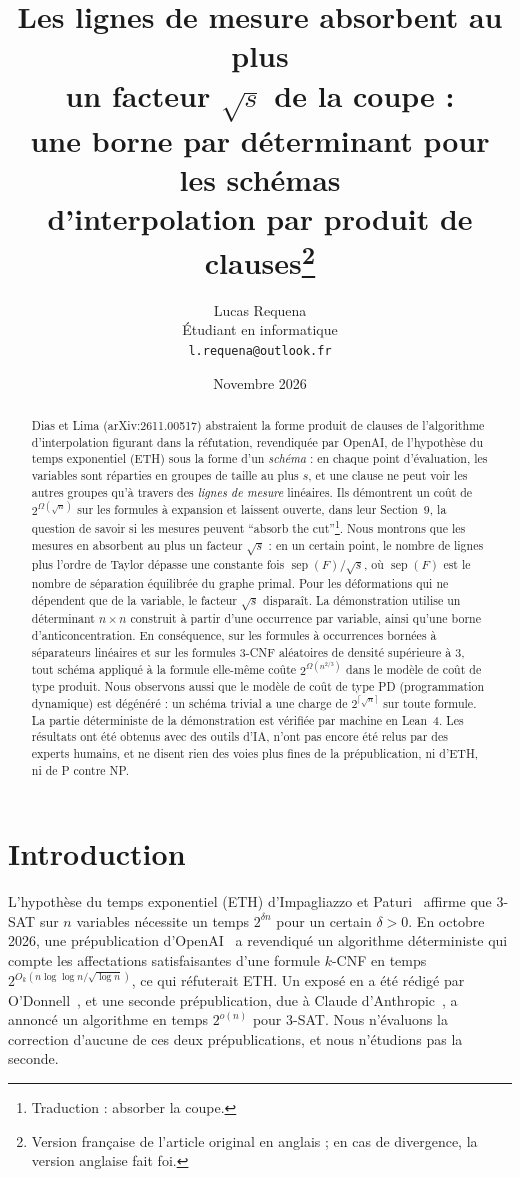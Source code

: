 \documentclass[11pt,a4paper]{article}
\title{Les lignes de mesure absorbent au plus\\ un facteur \texorpdfstring{$\sqrt{s}$}{sqrt(s)} de la coupe :\\
une borne par déterminant pour les schémas\\ d'interpolation par produit de
clauses\thanks{Version française de l'article original en anglais ; en cas de divergence, la
version anglaise fait foi.}}
\author{Lucas Requena\\[2pt]
{\small Étudiant en informatique}\\
{\small \texttt{l.requena@outlook.fr}}}
\date{Novembre 2026}
\makeatletter
\theoremstyle{definition}
\theoremstyle{remark}
\newcommand{\sep}{\operatorname{sep}}
\newcommand{\englishhyph}{\@ifundefined{l@english}{}{\language\l@english}}
\newcommand{\eng}[1]{{\englishhyph #1}}
\makeatother
\begin{document}
\maketitle

\begin{abstract}
Dias et Lima (arXiv:2611.00517) abstraient la forme produit de clauses de l'algorithme
d'interpolation figurant dans la réfutation, revendiquée par OpenAI, de l'hypothèse du temps
exponentiel (ETH) sous la forme d'un \emph{schéma} : en chaque point d'évaluation, les
variables sont réparties en groupes de taille au plus $s$, et une clause ne peut voir les
autres groupes qu'à travers des \emph{lignes de mesure} linéaires. Ils démontrent un coût de
$2^{\Omega(\sqrt n)}$ sur les formules à expansion et laissent ouverte, dans leur
Section~9, la question de savoir si les mesures peuvent \eng{``absorb the
cut''}\footnote{Traduction : \og absorber la coupe\fg{}.}. Nous montrons que les mesures en
absorbent au plus un facteur $\sqrt{s}$ : en un certain point, le nombre de lignes plus
l'ordre de Taylor dépasse une constante fois $\sep(F)/\sqrt{s}$, où $\sep(F)$ est le nombre
de séparation équilibrée du graphe primal. Pour les déformations qui ne dépendent que de la
variable, le facteur $\sqrt s$ disparaît. La démonstration utilise un déterminant
$n\times n$ construit à partir d'une occurrence par variable, ainsi qu'une borne
d'anticoncentration. En conséquence, sur les formules à occurrences bornées à séparateurs
linéaires et sur les formules 3-CNF aléatoires de densité supérieure à $3$, tout schéma
appliqué à la formule elle-même coûte $2^{\Omega(n^{2/3})}$ dans le modèle de coût de type
produit. Nous observons aussi que le modèle de coût de type PD (programmation dynamique) est
dégénéré : un schéma trivial a une charge de $2^{\lceil\sqrt n\rceil}$ sur toute formule. La
partie déterministe de la démonstration est vérifiée par machine en Lean~4. Les résultats
ont été obtenus avec des outils d'IA, n'ont pas encore été relus par des experts humains, et
ne disent rien des voies plus fines de la prépublication, ni d'ETH, ni de P contre NP.
\end{abstract}

\section{Introduction}\label{sec:intro}

L'hypothèse du temps exponentiel (ETH) d'Impagliazzo et Paturi~\cite{IP01} affirme que 3-SAT
sur $n$ variables nécessite un temps $2^{\delta n}$ pour un certain $\delta>0$. En octobre
2026, une prépublication d'OpenAI~\cite{OpenAI} a revendiqué un algorithme déterministe qui
compte les affectations satisfaisantes d'une formule $k$-CNF en temps
$2^{O_k(n\log\log n/\sqrt{\log n})}$, ce qui réfuterait ETH. Un exposé en a été rédigé par
O'Donnell~\cite{ODonnell}, et une seconde prépublication, due à Claude
d'Anthropic~\cite{Claude}, a annoncé un algorithme en temps $2^{o(n)}$ pour 3-SAT. Nous
n'évaluons la correction d'aucune de ces deux prépublications, et nous n'étudions pas la
seconde.
\end{document}
